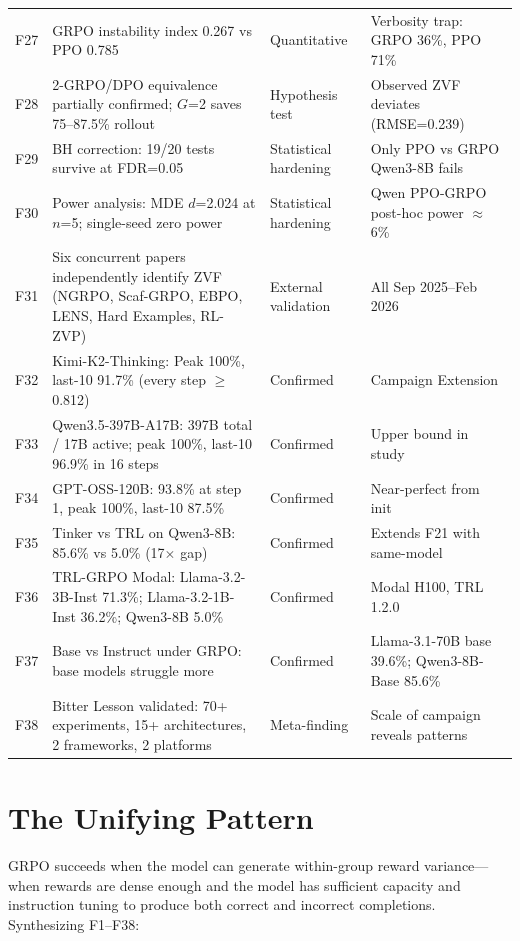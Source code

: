 \documentclass[12pt,a4paper]{report}
\theoremstyle{definition}
\begin{document}
\begin{small}
\begin{longtable}{p{0.5cm}p{7cm}p{2.3cm}p{4.5cm}}
F27 & GRPO instability index 0.267 vs PPO 0.785 & Quantitative & Verbosity trap: GRPO 36\%, PPO 71\% \\
F28 & 2-GRPO/DPO equivalence partially confirmed; $G$=2 saves 75--87.5\% rollout & Hypothesis test & Observed ZVF deviates (RMSE=0.239) \\
F29 & BH correction: 19/20 tests survive at FDR=0.05 & Statistical hardening & Only PPO vs GRPO Qwen3-8B fails \\
F30 & Power analysis: MDE $d$=2.024 at $n$=5; single-seed zero power & Statistical hardening & Qwen PPO-GRPO post-hoc power $\approx$6\% \\
F31 & Six concurrent papers independently identify ZVF (NGRPO, Scaf-GRPO, EBPO, LENS, Hard Examples, RL-ZVP) & External validation & All Sep 2025--Feb 2026 \\
F32 & Kimi-K2-Thinking: Peak 100\%, last-10 91.7\% (every step $\ge$0.812) & Confirmed & Campaign Extension \\
F33 & Qwen3.5-397B-A17B: 397B total / 17B active; peak 100\%, last-10 96.9\% in 16 steps & Confirmed & Upper bound in study \\
F34 & GPT-OSS-120B: 93.8\% at step 1, peak 100\%, last-10 87.5\% & Confirmed & Near-perfect from init \\
F35 & Tinker vs TRL on Qwen3-8B: 85.6\% vs 5.0\% (17$\times$ gap) & Confirmed & Extends F21 with same-model \\
F36 & TRL-GRPO Modal: Llama-3.2-3B-Inst 71.3\%; Llama-3.2-1B-Inst 36.2\%; Qwen3-8B 5.0\% & Confirmed & Modal H100, TRL 1.2.0 \\
F37 & Base vs Instruct under GRPO: base models struggle more & Confirmed & Llama-3.1-70B base 39.6\%; Qwen3-8B-Base 85.6\% \\
F38 & Bitter Lesson validated: 70+ experiments, 15+ architectures, 2 frameworks, 2 platforms & Meta-finding & Scale of campaign reveals patterns \\
\end{longtable}
\end{small}

\section{The Unifying Pattern}
\label{sec:unifying-pattern}

GRPO succeeds when the model can generate within-group reward variance---when rewards are dense enough
and the model has sufficient capacity and instruction tuning to produce both correct and incorrect
completions. Synthesizing F1--F38:
\end{document}
